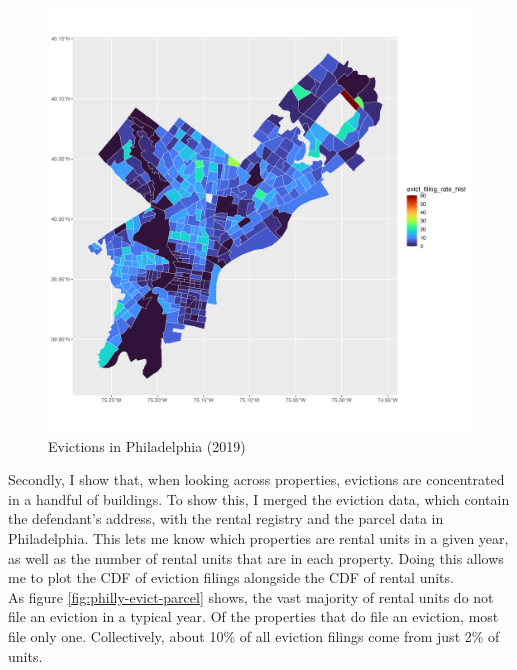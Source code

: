 \documentclass{article}
\begin{document}
\begin{figure}[htbp]
    \centering
    \includegraphics[width=1\linewidth]{figs/evict_filing_rate_hist.png}
    \caption{Evictions in Philadelphia (2019)}
    \label{fig:philly-map}
\end{figure}

Secondly, I show that, when looking across properties, evictions are concentrated in a handful of buildings. To show this, I merged the eviction data, which contain the defendant's address, with the rental registry and the parcel data in Philadelphia. This lets me know which properties are rental units in a given year, as well as the number of rental units that are in each property. Doing this allows me to plot the CDF of eviction filings alongside the CDF of rental units. \\

As figure \ref{fig:philly-evict-parcel} shows, the vast majority of rental units do not file an eviction in a typical year. Of the properties that do file an eviction, most file only one. Collectively, about 10\% of all eviction filings come from just 2\% of units. \\
\end{document}
